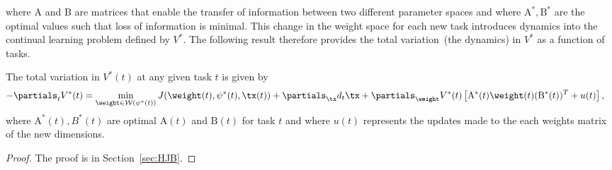where $\mathrm{A}$ and $\mathrm{B}$ are matrices that enable the transfer of information between two different parameter spaces and where $\mathrm{A}^*, \mathrm{B}^*$ are the optimal values such that loss of information is minimal. This change in the weight space for each new task introduces dynamics into the continual learning problem defined by $V^*.$ The following result therefore provides the total variation~(the dynamics) in $V^*$ as a function of tasks.
\begin{proposition}\label{HJB}
    The total variation in $V^*(t)$ at any given task $t$ is given by
    \begin{align}\label{eq:HJB}
        -\partials_t V^*(t)& = \min_{\weight \in \mathcal{W}(\psi^*(t))} J(\weight(t),\psi^*(t),\tx(t)) + \partials_{\tx}d_{t} \tx+ \partials_{\weight} V^*(t) \left[\mathrm{A}^*(t)\weight(t)( \mathrm{B}^*(t))^T + u(t)\right],
    \end{align}
    where $\mathrm{A}^*(t),B^*(t)$ are optimal $\mathrm{A}(t)$ and $\mathrm{B}(t)$ for task $t$ and where $u(t)$ represents the updates made to the each weights matrix of the new dimensions. 
\end{proposition}
\begin{proof}
    The proof is in Section~\ref{sec:HJB}.
\end{proof}

